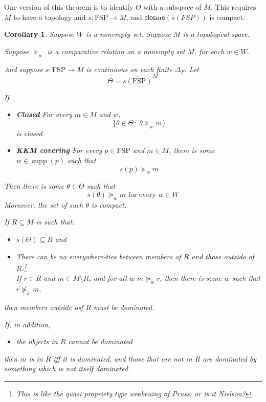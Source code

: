 \documentclass[11pt]{article}
\newtheorem{corollary}[theorem]{Corollary}
\theoremstyle{definition}
\theoremstyle{remark}
\newcommand{\supp}{\operatorname{supp}}
\newcommand{\given}{\,:\,}
\newcommand{\FSP}{\mathrm{FSP}}
\newcommand{\closure}{\mathsf{closure}}
\begin{document}
One version of this theorem is to identify $\Theta$ with a subspace of $M$. This requires $M$ to have a topology and $s:\FSP\to M$, and $\closure(s(FSP))$ is compact. 

\begin{center}
\end{center}


\begin{corollary}
	Suppose $W$ is a nonempty set. Suppose $M$ is a topological space.
	
	Suppose $\succeq_w$ is a comparative relation on a nonempty set $M$, for each $w\in W$. 
	
	And suppose $s:\FSP\to M$ is continuous on each finite $\Delta_F$. Let $$\Theta=\overline{s(\FSP)}^{\,M}$$
	
	If \begin{itemize}
		\item \textbf{Closed} For every $m\in M$ and $w$, \[\{\theta\in\Theta\given \theta\succeq_w m\}\] is closed
		\item \textbf{KKM covering} For every $p\in \FSP$ and $m\in M$, there is some $w\in\supp(p)$ such that $$s(p)\succeq_w m$$
	\end{itemize}
	Then there is some $\theta\in\Theta$ such that 
	\[
	s(\theta)\succeq_w m
	\text{ for every }w\in W
	\] 
	Moreover, the set of such $\theta$ is compact.
	
	If $R\subseteq M$ is such that:
	\begin{itemize}
		\item $s(\Theta)\subseteq R$ and
		\item There can be no everywhere-ties between members of $R$ and those outside of $R$:\footnote{This is like the quasi propriety type weakening of Pruss, or is it Nielson?} \\
		If $r\in R$ and $m\in M\setminus R$, and for all $w$ $m\succeq_w r$, then there is some $w$ such that $r\not\succeq_w m$.
	\end{itemize}then members outside osf $R$ must be dominated. 
	
	If, in addition, \begin{itemize}
		\item the objects in $R$ cannot be dominated
	\end{itemize} then $m$ is in $R$ iff it is dominated, and those that are not in $R$ are dominated by something which is not itself dominated. 
\end{corollary}
\end{document}
